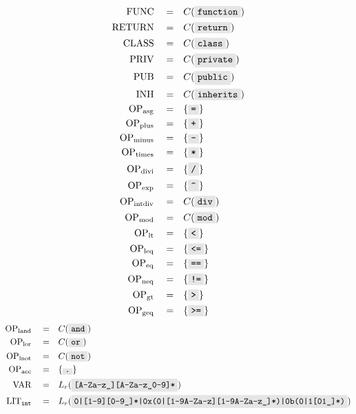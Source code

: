 \documentclass{article}
\newcommand{\code}[1]{\colorbox{gray!20}{\texttt{#1}}}
\begin{document}
\begin{multicols}{2}
\begin{align}
    \mathrm{FUNC}\quad =&\quad C( \code{function} ) \\
    \mathrm{RETURN}\quad =&\quad C( \code{return} ) \\
    \mathrm{CLASS}\quad =&\quad C( \code{class} ) \\
    \mathrm{PRIV}\quad =&\quad C( \code{private} ) \\
    \mathrm{PUB}\quad =&\quad C( \code{public} ) \\
    \mathrm{INH}\quad =&\quad C( \code{inherits} ) \\
    \mathrm{OP}_\mathrm{asg}\quad =&\quad \{\code=\} \\
    \mathrm{OP}_\mathrm{plus}\quad =&\quad \{\code+\} \\
    \mathrm{OP}_\mathrm{minus}\quad =&\quad \{\code-\} \\
    \mathrm{OP}_\mathrm{times}\quad =&\quad \{\code*\} \\
    \mathrm{OP}_\mathrm{divi}\quad =&\quad \{\code/\} \\
    \mathrm{OP}_\mathrm{exp}\quad =&\quad \{\code\textasciicircum\} \\
    \mathrm{OP}_\mathrm{intdiv}\quad =&\quad C(\code{div}) \\
    \mathrm{OP}_\mathrm{mod}\quad =&\quad C(\code{mod}) \\
    \mathrm{OP}_\mathrm{lt}\quad =&\quad \{\code{<}\} \\
    \mathrm{OP}_\mathrm{leq}\quad =&\quad \{\code{<=}\} \\
    \mathrm{OP}_\mathrm{eq}\quad =&\quad \{\code{==}\} \\
    \mathrm{OP}_\mathrm{neq}\quad =&\quad \{\code{!=}\} \\
    \mathrm{OP}_\mathrm{gt}\quad =&\quad \{\code>\} \\
    \mathrm{OP}_\mathrm{geq}\quad =&\quad \{\code{>=}\}
\end{align}
\begin{align}
    \mathrm{OP}_\mathrm{land}\quad =&\quad C(\code{and}) \\
    \mathrm{OP}_\mathrm{lor}\quad =&\quad C(\code{or}) \\
    \mathrm{OP}_\mathrm{lnot}\quad =&\quad C(\code{not}) \\
    \mathrm{OP}_\mathrm{acc}\quad =&\quad \{\code.\} \\
    \mathrm{VAR}\quad =& \quad L_r(\code{[A-Za-z\_][A-Za-z\_0-9]*} ) \\
    \mathrm{LIT}_{\mathtt{int}} \quad=&\quad L_r(\code{0|[1-9][0-9\_]*|0x(0|[1-9A-Za-z][1-9A-Za-z\_]*)|0b(0|1[01\_]*)}) \\

\end{align}
\end{multicols}
\end{document}
